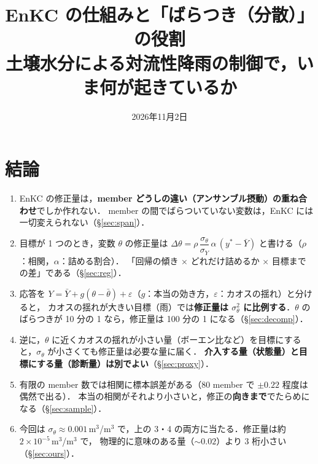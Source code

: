 \documentclass[dvipdfmx,a4paper,10.5pt]{jarticle}
\title{EnKC の仕組みと「ばらつき（分散）」の役割\\[2pt]
\large 土壌水分による対流性降雨の制御で，いま何が起きているか}
\author{}
\date{2026年11月2日}
\numberwithin{equation}{section}
\begin{document}
\maketitle
\tableofcontents
\clearpage

\section{結論}

\begin{point}[title=この解説で示すこと]
\begin{enumerate}
  \item EnKC の修正量は，\textbf{member どうしの違い（アンサンブル摂動）の重ね合わせ}でしか作れない．
        member の間でばらついていない変数は，EnKC には一切変えられない（\S\ref{sec:span}）．
  \item 目標が 1 つのとき，変数 $\theta$ の修正量は
        $\Delta\theta = \rho\,\dfrac{\sigma_\theta}{\sigma_Y}\,\alpha\,(y^*-\bar Y)$ と書ける（$\rho$：相関，$\alpha$：詰める割合）．
        「回帰の傾き × どれだけ詰めるか × 目標までの差」である（\S\ref{sec:reg}）．
  \item 応答を $Y = \bar Y + g(\theta-\bar\theta) + \varepsilon$（$g$：本当の効き方，$\varepsilon$：カオスの揺れ）と分けると，
        カオスの揺れが大きい目標（雨）では\textbf{修正量は $\sigma_\theta^2$ に比例する}．$\theta$ のばらつきが 10 分の 1 なら，修正量は 100 分の 1 になる（\S\ref{sec:decomp}）．
  \item 逆に，$\theta$ に近くカオスの揺れが小さい量（ボーエン比など）を目標にすると，$\sigma_\theta$ が小さくても修正量は必要な量に届く．
        \textbf{介入する量（状態量）と目標にする量（診断量）は別でよい}（\S\ref{sec:proxy}）．
  \item 有限の member 数では相関に標本誤差がある（80 member で $\pm 0.22$ 程度は偶然で出る）．
        本当の相関がそれより小さいと，修正の\textbf{向きまで}でたらめになる（\S\ref{sec:sample}）．
  \item 今回は $\sigma_\theta \approx 0.001$\,m$^3$/m$^3$ で，上の 3・4 の両方に当たる．修正量は約 $2\times10^{-5}$\,m$^3$/m$^3$ で，
        物理的に意味のある量（$\sim 0.02$）より 3 桁小さい（\S\ref{sec:ours}）．
\end{enumerate}
\end{point}

\end{document}

